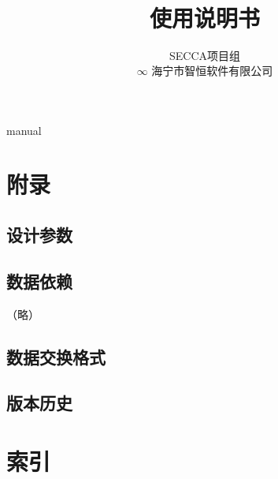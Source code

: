 \documentclass[hyperref, oneside]{book}
\title {\modtitle \\ \modsubtitle \\ 使用说明书}
\author{SECCA项目组 \\ $\infty$ \small{海宁市智恒软件有限公司}}
\begin{document}
\renewcommand*\sectionmark[1]{\markright{\thesection. #1}}
\renewcommand*\thesection{\arabic{section}}

\maketitle

\renewcommand\contentsname{目录/Contents}
\tableofcontents
\clearpage

\def\DIRNAME{.}
{manual}

\section{附录}

    \subsection{设计参数}
        \begin{landscape}
        \end{landscape}

    \subsection{数据依赖}
        （略）

    \subsection{数据交换格式}
        \begin{landscape}
        
        \end{landscape}

    \clearpage
    \subsection{版本历史}
        \begin{center}
        \centering
        \end{center}

\section{索引}

    \listoftables
    \listoffigures
\end{document}
